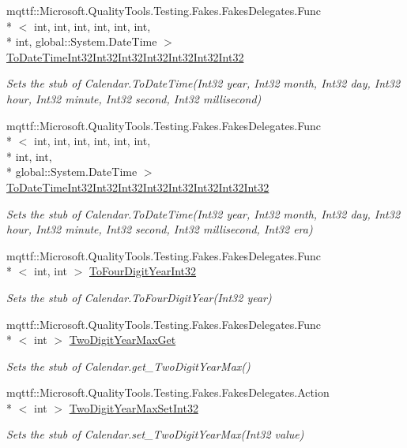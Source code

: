 \begin{DoxyCompactItemize}
mqttf\-::\-Microsoft.\-Quality\-Tools.\-Testing.\-Fakes.\-Fakes\-Delegates.\-Func\\*
$<$ int, int, int, int, int, int, \\*
int, global\-::\-System.\-Date\-Time $>$ \hyperlink{class_system_1_1_globalization_1_1_fakes_1_1_stub_calendar_a1d39a795e9bf297bd8c6605bf0d40966}{To\-Date\-Time\-Int32\-Int32\-Int32\-Int32\-Int32\-Int32\-Int32}
\begin{DoxyCompactList}\small\item\em Sets the stub of Calendar.\-To\-Date\-Time(\-Int32 year, Int32 month, Int32 day, Int32 hour, Int32 minute, Int32 second, Int32 millisecond)\end{DoxyCompactList}\item 
mqttf\-::\-Microsoft.\-Quality\-Tools.\-Testing.\-Fakes.\-Fakes\-Delegates.\-Func\\*
$<$ int, int, int, int, int, int, \\*
int, int, \\*
global\-::\-System.\-Date\-Time $>$ \hyperlink{class_system_1_1_globalization_1_1_fakes_1_1_stub_calendar_af84a8e567da3f0854bee0a14bf12d2f4}{To\-Date\-Time\-Int32\-Int32\-Int32\-Int32\-Int32\-Int32\-Int32\-Int32}
\begin{DoxyCompactList}\small\item\em Sets the stub of Calendar.\-To\-Date\-Time(\-Int32 year, Int32 month, Int32 day, Int32 hour, Int32 minute, Int32 second, Int32 millisecond, Int32 era)\end{DoxyCompactList}\item 
mqttf\-::\-Microsoft.\-Quality\-Tools.\-Testing.\-Fakes.\-Fakes\-Delegates.\-Func\\*
$<$ int, int $>$ \hyperlink{class_system_1_1_globalization_1_1_fakes_1_1_stub_calendar_a75c4247cb30ca8a8eecbce291c5b9a14}{To\-Four\-Digit\-Year\-Int32}
\begin{DoxyCompactList}\small\item\em Sets the stub of Calendar.\-To\-Four\-Digit\-Year(\-Int32 year)\end{DoxyCompactList}\item 
mqttf\-::\-Microsoft.\-Quality\-Tools.\-Testing.\-Fakes.\-Fakes\-Delegates.\-Func\\*
$<$ int $>$ \hyperlink{class_system_1_1_globalization_1_1_fakes_1_1_stub_calendar_aa5364409f91dff411cb85dd2252bedf0}{Two\-Digit\-Year\-Max\-Get}
\begin{DoxyCompactList}\small\item\em Sets the stub of Calendar.\-get\-\_\-\-Two\-Digit\-Year\-Max()\end{DoxyCompactList}\item 
mqttf\-::\-Microsoft.\-Quality\-Tools.\-Testing.\-Fakes.\-Fakes\-Delegates.\-Action\\*
$<$ int $>$ \hyperlink{class_system_1_1_globalization_1_1_fakes_1_1_stub_calendar_a54a3991ee692bb10c8f7a45a1f1ae28f}{Two\-Digit\-Year\-Max\-Set\-Int32}
\begin{DoxyCompactList}\small\item\em Sets the stub of Calendar.\-set\-\_\-\-Two\-Digit\-Year\-Max(\-Int32 value)\end{DoxyCompactList}\end{DoxyCompactItemize}
